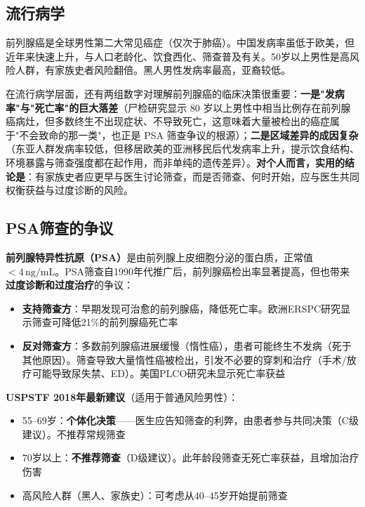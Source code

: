 \subsection{流行病学}

前列腺癌是全球男性第二大常见癌症（仅次于肺癌）。中国发病率虽低于欧美，但近年来快速上升，与人口老龄化、饮食西化、筛查普及有关。50岁以上男性是高风险人群，有家族史者风险翻倍。黑人男性发病率最高，亚裔较低。


在流行病学层面，还有两组数字对理解前列腺癌的临床决策很重要：\textbf{一是"发病率"与"死亡率"的巨大落差}（尸检研究显示 80 岁以上男性中相当比例存在前列腺癌病灶，但多数终生不出现症状、不导致死亡，这意味着大量被检出的癌症属于"不会致命的那一类"，也正是 PSA 筛查争议的根源）；\textbf{二是区域差异的成因复杂}（东亚人群发病率较低，但移居欧美的亚洲移民后代发病率上升，提示饮食结构、环境暴露与筛查强度都在起作用，而非单纯的遗传差异）。\textbf{对个人而言，实用的结论是}：有家族史者应更早与医生讨论筛查，而是否筛查、何时开始，应与医生共同权衡获益与过度诊断的风险。

\subsection{PSA筛查的争议}

\textbf{前列腺特异性抗原（PSA）}是由前列腺上皮细胞分泌的蛋白质，正常值$<4\,\mathrm{ng/mL}$。PSA筛查自1990年代推广后，前列腺癌检出率显著提高，但也带来\textbf{过度诊断和过度治疗}的争议：

\begin{itemize}[leftmargin=2cm]
	\item \textbf{支持筛查方}：早期发现可治愈的前列腺癌，降低死亡率。欧洲ERSPC研究显示筛查可降低21\%的前列腺癌死亡率
	\item \textbf{反对筛查方}：多数前列腺癌进展缓慢（惰性癌），患者可能终生不发病（死于其他原因）。筛查导致大量惰性癌被检出，引发不必要的穿刺和治疗（手术/放疗可能导致尿失禁、ED）。美国PLCO研究未显示死亡率获益
\end{itemize}

\textbf{USPSTF 2018年最新建议}（适用于普通风险男性）：
\begin{itemize}[leftmargin=2cm]
	\item 55--69岁：\textbf{个体化决策}——医生应告知筛查的利弊，由患者参与共同决策（C级建议）。不推荐常规筛查
	\item 70岁以上：\textbf{不推荐筛查}（D级建议）。此年龄段筛查无死亡率获益，且增加治疗伤害
	\item 高风险人群（黑人、家族史）：可考虑从40--45岁开始提前筛查
\end{itemize}

